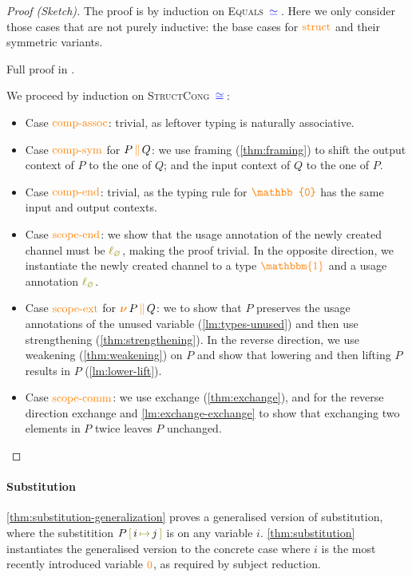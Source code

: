 \documentclass[sigplan,10pt,anonymous,review]{acmart}
\theoremstyle{definition}
\newcommand{\type}[1]{\textcolor{blue}{\operatorname{#1}}}
\newcommand{\constr}[1]{\textcolor{orange}{\operatorname{#1}}}
\newcommand{\func}[1]{\textcolor{olive}{\operatorname{#1}}}
\newcommand{\PO}{\constr{\mathbb{0}}}
\newcommand{\comp}[2]{#1 \, \constr{\parallel} \, #2}
\newcommand{\new}{\constr{\boldsymbol{\nu}} \,}
\newcommand{\unit}{\constr{\mathbbm{1}}}
\newcommand{\subst}[3]{#1 \, \func{[} \, #3 \, \func{\mapsto} \,#2 \, \func{]}}
\newcommand{\lz}{\func{\ell_{\varnothing}}}
\newcommand{\eq}[1]{\, \type{\simeq}_{#1} \,}
\newcommand{\eqeq}{\, \type{\cong} \,}
\begin{document}
\begin{proof}[Proof (Sketch)]
  The proof is by induction on \textsc{Equals} $\eq{}$.
  Here we only consider those cases that are not purely inductive: the base cases for $\constr{struct}$ and their symmetric variants.
\begin{anonsuppress}
Full proof in \cite{Zalakain2020Agda}.
\end{anonsuppress}
  We proceed by induction on \textsc{StructCong} $\eqeq$:
  \begin{itemize}
    \item
      Case $\constr{comp-assoc}$: trivial, as leftover typing is naturally associative.
    \item
      Case $\constr{comp-sym}$ for $\comp{P}{Q}$: we use framing (\autoref{thm:framing}) to shift the output context of $P$ to the one of $Q$; and the input context of $Q$ to the one of $P$.
    \item
      Case $\constr{comp-end}$: trivial, as the typing rule for $\PO$ has the same input and output contexts.
    \item
      Case $\constr{scope-end}$: we show that the usage annotation of the newly created channel must be $\lz$, making the proof trivial.
      In the opposite direction, we instantiate the newly created channel to a type $\unit$ and a usage annotation $\lz$.
    \item
      Case $\constr{scope-ext}$ for $\new \comp{P}{Q}$: we to show that $P$ preserves the usage annotations of the unused variable (\autoref{lm:types-unused}) and then use strengthening (\autoref{thm:strengthening}).
      In the reverse direction, we use weakening (\autoref{thm:weakening}) on $P$ and show that lowering and then lifting $P$ results in $P$ (\autoref{lm:lower-lift}).
    \item
      Case $\constr{scope-comm}$:
      we use exchange (\autoref{thm:exchange}), and for the reverse direction exchange and \autoref{lm:exchange-exchange} to show that exchanging two elements in $P$ twice leaves $P$ unchanged. \qedhere
  \end{itemize}
\end{proof}

\paragraph*{Substitution}
\autoref{thm:substitution-generalization} proves a generalised version of substitution, where the substitition $\subst{P}{j}{i}$ is on any variable $i$.
\autoref{thm:substitution} instantiates the generalised version to the concrete case where $i$ is the most recently introduced variable $\constr{0}$, as required by subject reduction.
\end{document}
